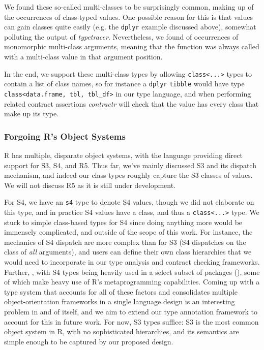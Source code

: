 \documentclass[acmsmall,review,anonymous]{acmart}\settopmatter{printfolios=true,printccs=false,printacmref=false}
\newcommand{\code}[1]{{\lstinline[style=Rin]!#1!}\xspace}
\newcommand{\contractr}{\emph{contractr}\xspace} %
\newcommand{\typetracer}{\emph{typetracer}\xspace} %
\begin{document}
We found these so-called multi-classes to be surprisingly common, making up  of the occurrences of class-typed values.
One possible reason for this is that values can gain classes quite easily (e.g. the \code{dplyr} example discussed above), somewhat polluting the output of \typetracer.
Nevertheless, we found  of occurrences of monomorphic multi-class arguments, meaning that the function was always called with a multi-class value in that argument position.

In the end, we support these multi-class types by allowing \code{class<...>} types to contain a list of class names, so for instance a \code{dplyr} \code{tibble} would have type \code{class<data.frame, tbl, tbl_df>} in our type language, and when performing related contract assertions \contractr will check that the value has every class that make up its type.

%
%
\subsubsection{Forgoing R's Object Systems}

R has multiple, disparate object systems, with the language providing direct
support for S3, S4, and R5.  Thus far, we've mainly discussed S3 and its
dispatch mechanism, and indeed our class types roughly capture the S3
classes of values.  We will not discuss R5 as it is still under
development.

For S4, we have an \code{s4} type to denote S4 values, though we did not elaborate on this type, and in practice S4 values have a class, and thus a \code{class<...>} type.  
We stuck to simple class-based types for S4 since doing anything more would be immensely complicated, and outside of the scope of this work.
For instance, the mechanics of S4 dispatch are more complex than for S3 (S4 dispatches on the class of {\it all} arguments), and users can define their own class hierarchies that we would need to incorporate in our type analysis and contract checking frameworks.  
Further, , with S4 types being heavily used in a select subset of packages (), some of which make heavy use of R's metaprogramming capabilities.  
Coming up with a type system that accounts for all of these factors and consolidates multiple object-orientation frameworks in a single language design is an interesting problem in and of itself, and we aim to extend our type annotation framework to account for this in future work.  
For now, S3 types suffice: S3 is the most common object system in R, with no sophisticated hierarchies, and its semantics are simple enough to be captured by our proposed design.
\end{document}
